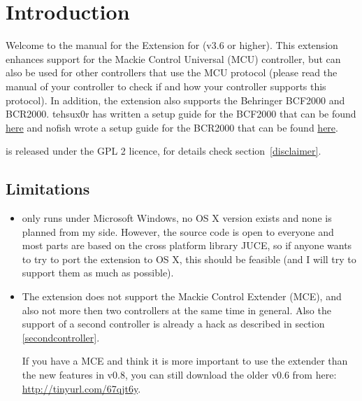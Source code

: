 
\section{Introduction}

Welcome to the manual for the \mcu Extension for \reaper (v3.6 or
higher). This extension enhances support for the Mackie Control
Universal (MCU) controller, but can also be used for other controllers
that use the MCU protocol (please read the manual of your
controller to check if and how your controller supports this
protocol). In addition, the extension also supports the Behringer
BCF2000 and BCR2000. tehsux0r has written a setup guide for the
BCF2000 that can be found
\href{http://forum.cockos.com/showthread.php?t=117909}{here}
and nofish wrote a setup guide for the BCR2000 that can be found
\href{http://forum.cockos.com/showthread.php?t=60110}{here}.

\mcu is released under the GPL 2 licence, for details check
section~\ref{disclaimer}.

\subsection{Limitations}
\begin{itemize}
\item \mcu only runs under Microsoft Windows, no OS X version exists
  and none is planned from my side. However, the source code is open to
  everyone and most parts are based on the cross platform library
  JUCE, so if anyone wants to try to port the extension to OS X, this
  should be feasible (and I will try to support them as much as
  possible).

\item The extension does not support the Mackie Control Extender
  (MCE), and also not more then two controllers at the same time in
  general. Also the support of a second controller is already a hack as
  described in section \ref{secondcontroller}.

  If you have a MCE and think it is more important to use the extender
  than the new features in v0.8, you can still download the older v0.6
  from here: \url{http://tinyurl.com/67qjt6y}.

\end{itemize}

% 

